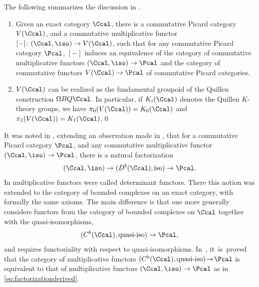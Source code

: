 The following summarizes the discussion in \cite[]{Deligne-determinant}.

\skpt
\begin{theorem}\label{thm:delignevirtual}
\begin{enumerate}
\item Given an exact category $\Ccal$, there is a commutative Picard category $V(\Ccal)$, and a commutative multiplicative functor $[-]\colon(\Ccal, \iso) \to V(\Ccal)$, such that for any commutative Picard category $\Pcal$, $[-]$ induces an equivalence of the category of commutative multiplicative functors $(\Ccal, \iso) \to \Pcal$ and the category of commutative functors $V(\Ccal) \to \Pcal$ of commutative Picard categories.
\item $V(\Ccal)$ can be realized as the fundamental groupoid of the Quillen construction $\Omega BQ\Ccal$. In particular, if $K_i(\Ccal)$ denotes the Quillen $K$-theory groups, we have $\pi_0(V(\Ccal)) = K_0(\Ccal)$ and $\pi_1(V(\Ccal)) = K_1(\Ccal)$.\qed
\end{enumerate}
\end{theorem}

It was noted in \cite[]{Deligne-determinant}, extending an observation made in \cite{KnudsenMumford}, that for a commutative Picard category $\Pcal$, and any commutative multiplicative functor $(\Ccal, \iso) \to \Pcal$, there is a natural factorization\vspace*{-3pt}
\begin{equation}\label{eq:factorizationderived}
(\Ccal, \iso) \to (D^b(\Ccal), \hbox{iso}) \to \Pcal.
\end{equation}
In \cite{Knudsen} multiplicative functors were called determinant functors. There this notion was extended to the category of bounded complexes on an exact category, with formally the same axioms. The main difference is that one more generally considers functors from the category of bounded complexes on $\Ccal$ together with the quasi-isomorphisms,
\begin{displaymath}
(C^b(\Ccal), \hbox{quasi-iso}) \to \Pcal,
\end{displaymath}
and requires functoriality with respect to quasi-isomorphisms. In~\cite[Th.\,2.3]{Knudsen}, it~is~proved that the category of multiplicative functors \hbox{$(C^b(\Ccal), \text{quasi-iso})\!\to\! \Pcal$} is equivalent to that of multiplicative functors $(\Ccal, \iso) \to \Pcal$ as in \eqref{eq:factorizationderived}.


